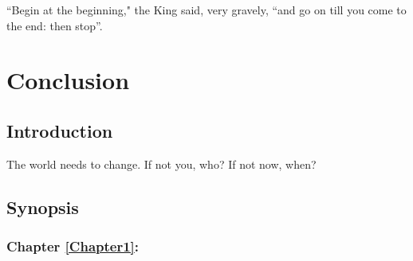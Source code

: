 
\begin{savequote}[\quotewidth]
``Begin at the beginning," the King said, very gravely, ``and go on till you come to the end: then stop''.
\end{savequote}

\chapter{Conclusion} %


\label{Chapter8} %



\section{Introduction}

The world needs to change. If not you, who? If not now, when?

\section{Synopsis}

\subsection{Chapter \ref{Chapter1}:  }

